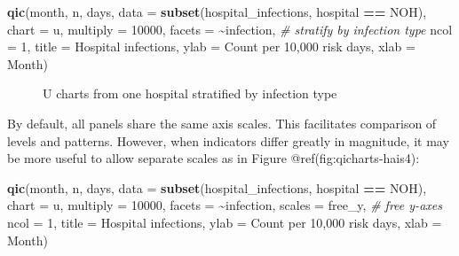 \documentclass[
]{book}
\makeatletter
\newenvironment{Shaded}{\begin{snugshade}}{\end{snugshade}}
\newcommand{\AttributeTok}[1]{\textcolor[rgb]{0.13,0.29,0.53}{#1}}
\newcommand{\CommentTok}[1]{\textcolor[rgb]{0.56,0.35,0.01}{\textit{#1}}}
\newcommand{\DecValTok}[1]{\textcolor[rgb]{0.00,0.00,0.81}{#1}}
\newcommand{\FunctionTok}[1]{\textcolor[rgb]{0.13,0.29,0.53}{\textbf{#1}}}
\newcommand{\NormalTok}[1]{#1}
\newcommand{\SpecialCharTok}[1]{\textcolor[rgb]{0.81,0.36,0.00}{\textbf{#1}}}
\newcommand{\StringTok}[1]{\textcolor[rgb]{0.31,0.60,0.02}{#1}}
\newcommand*\pandocbounded[1]{%
  \sbox\pandoc@box{#1}%
  \Gscale@div\@tempa{\textheight}{\dimexpr\ht\pandoc@box+\dp\pandoc@box\relax}%
  \Gscale@div\@tempb{\linewidth}{\wd\pandoc@box}%
  \ifdim\@tempb\p@<\@tempa\p@\let\@tempa\@tempb\fi%
  \ifdim\@tempa\p@<\p@\scalebox{\@tempa}{\usebox\pandoc@box}%
  \else\usebox{\pandoc@box}%
  \fi%
}
\makeatother
\begin{document}
\begin{Shaded}
\begin{Highlighting}[]
\FunctionTok{qic}\NormalTok{(month, n, days, }
    \AttributeTok{data     =} \FunctionTok{subset}\NormalTok{(hospital\_infections, }
\NormalTok{                      hospital }\SpecialCharTok{==} \StringTok{\textquotesingle{}NOH\textquotesingle{}}\NormalTok{),}
    \AttributeTok{chart    =} \StringTok{\textquotesingle{}u\textquotesingle{}}\NormalTok{,}
    \AttributeTok{multiply =} \DecValTok{10000}\NormalTok{,}
    \AttributeTok{facets   =} \SpecialCharTok{\textasciitilde{}}\NormalTok{infection,                   }\CommentTok{\# stratify by infection type}
    \AttributeTok{ncol     =} \DecValTok{1}\NormalTok{,}
    \AttributeTok{title    =} \StringTok{\textquotesingle{}Hospital infections\textquotesingle{}}\NormalTok{,}
    \AttributeTok{ylab     =} \StringTok{\textquotesingle{}Count per 10,000 risk days\textquotesingle{}}\NormalTok{,}
    \AttributeTok{xlab     =} \StringTok{\textquotesingle{}Month\textquotesingle{}}\NormalTok{)}
\end{Highlighting}
\end{Shaded}

\begin{figure}
\centering
\pandocbounded{}
\caption{U charts from one hospital stratified by infection type}
\end{figure}

By default, all panels share the same axis scales. This facilitates
comparison of levels and patterns. However, when indicators differ
greatly in magnitude, it may be more useful to allow separate scales as
in Figure @ref(fig:qicharts-hais4):

\begin{Shaded}
\begin{Highlighting}[]
\FunctionTok{qic}\NormalTok{(month, n, days, }
    \AttributeTok{data     =} \FunctionTok{subset}\NormalTok{(hospital\_infections, hospital }\SpecialCharTok{==} \StringTok{\textquotesingle{}NOH\textquotesingle{}}\NormalTok{),}
    \AttributeTok{chart    =} \StringTok{\textquotesingle{}u\textquotesingle{}}\NormalTok{,}
    \AttributeTok{multiply =} \DecValTok{10000}\NormalTok{,}
    \AttributeTok{facets   =} \SpecialCharTok{\textasciitilde{}}\NormalTok{infection,}
    \AttributeTok{scales   =} \StringTok{\textquotesingle{}free\_y\textquotesingle{}}\NormalTok{,                      }\CommentTok{\# free y{-}axes}
    \AttributeTok{ncol     =} \DecValTok{1}\NormalTok{,}
    \AttributeTok{title    =} \StringTok{\textquotesingle{}Hospital infections\textquotesingle{}}\NormalTok{,}
    \AttributeTok{ylab     =} \StringTok{\textquotesingle{}Count per 10,000 risk days\textquotesingle{}}\NormalTok{,}
    \AttributeTok{xlab     =} \StringTok{\textquotesingle{}Month\textquotesingle{}}\NormalTok{)}
\end{Highlighting}
\end{Shaded}
\end{document}
